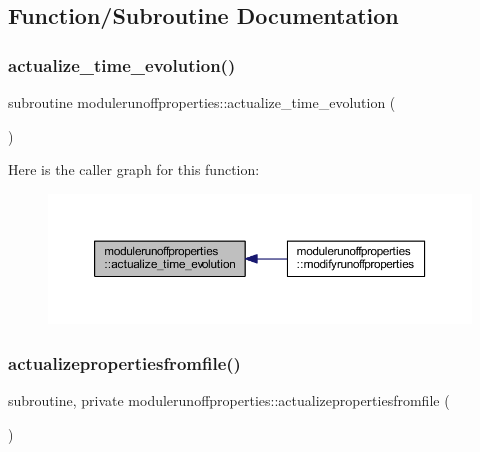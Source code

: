 \subsection{Function/\+Subroutine Documentation}
\mbox{\label{namespacemodulerunoffproperties_a05009fe293792ec5af707219d9fe4ab0}} 
\subsubsection{\texorpdfstring{actualize\+\_\+time\+\_\+evolution()}{actualize\_time\_evolution()}}
{\footnotesize\ttfamily subroutine modulerunoffproperties\+::actualize\+\_\+time\+\_\+evolution (\begin{DoxyParamCaption}{ }\end{DoxyParamCaption})\hspace{0.3cm}{\ttfamily [private]}}

Here is the caller graph for this function\+:\nopagebreak
\begin{figure}[H]
\begin{center}
\leavevmode
\includegraphics[width=350pt]{namespacemodulerunoffproperties_a05009fe293792ec5af707219d9fe4ab0_icgraph}
\end{center}
\end{figure}
\mbox{\label{namespacemodulerunoffproperties_a6cb9ce64b26164eb148aae403b3e9ab0}} 
\subsubsection{\texorpdfstring{actualizepropertiesfromfile()}{actualizepropertiesfromfile()}}
{\footnotesize\ttfamily subroutine, private modulerunoffproperties\+::actualizepropertiesfromfile (\begin{DoxyParamCaption}{ }\end{DoxyParamCaption})\hspace{0.3cm}{\ttfamily [private]}}

